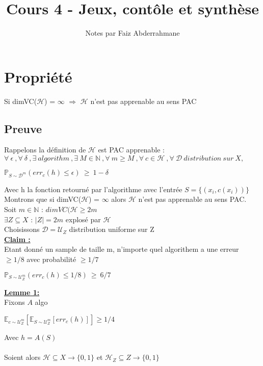\documentclass{article}
\title{Cours 4 - Jeux, contôle et synthèse}
\author{Notes par Faiz Abderrahmane}
\date{ }
\begin{document}
\maketitle

\section*{Propriété}
Si dimVC($\mathcal{H}$) = $\infty$ $\Longrightarrow$ $\mathcal{H}$ n'est pas apprenable au sens PAC

\subsection*{Preuve}

Rappelons la définition de $\mathcal{H}$ est PAC apprenable :\\
$\forall~\epsilon~,\forall~\delta~,\exists~algorithm~,\exists~M \in \mathbb{N}~,\forall~m \geq M~,\forall~c \in \mathcal{H}~,
\forall~\mathcal{D}~ distribution~sur~X,$
\begin{center}
    $ \mathbb{P}_{S \sim \mathcal{D}^m} (err_c(h)\leq \epsilon) ~ \geq ~ 1-\delta$
\end{center}
Avec h la fonction retourné par l'algorithme avec l'entrée $S=\{(x_i,c(x_i))\}$
Montrons que si dimVC($\mathcal{H}$) = $\infty$ alors $\mathcal{H}$ n'est pas apprenable au sens PAC.\\
Soit $m \in \mathbb{N}$ : $dimVC(\mathcal{H} \geq 2m$\\
$\exists Z \subseteq X$ : $|Z|=2m$ explosé par $\mathcal{H}$\\
Choisissons $\mathcal{D} =\mathcal{U}_Z$ distribution uniforme sur Z\\
\underline{\textbf{Claim :}}\\
Etant donné un sample de taille m, n'importe quel algorithem a une erreur $\geq 1/8$ avec probabilité $\geq 1/7$
\begin{center}
        $ \mathbb{P}_{S \sim \mathcal{U}_Z^m} (err_c(h)\leq 1/8) ~ \geq ~ 6/7$
\end{center}
\underline{\textbf{Lemme 1:}}\\
Fixons $A$ algo
\begin{center}
    $\mathbb{E}_{ c \sim \mathcal{U}_Z^m} [\mathbb{E}_{ S \sim \mathcal{U}_Z^m} [err_c(h)]] \geq 1/4$
\end{center}
Avec $h = A(S)$\\ \\
Soient alors $\mathcal{H} \subseteq X \rightarrow \{0,1\}$ et $\mathcal{H}_Z \subseteq Z \rightarrow \{0,1\}$\\
\end{document}
